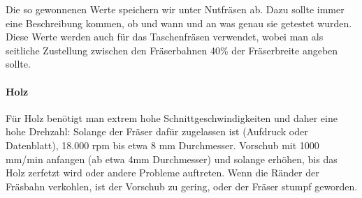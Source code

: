 \documentclass{\basedir/fablab-document}
\begin{document}
Die so gewonnenen Werte speichern wir unter Nutfräsen ab. Dazu sollte immer eine Beschreibung kommen, ob und wann und an was genau sie getestet wurden. Diese Werte werden auch für das Taschenfräsen verwendet, wobei man als seitliche Zustellung zwischen den Fräserbahnen 40\% der Fräserbreite angeben sollte.

\paragraph{Holz} Für Holz benötigt man extrem hohe Schnittgeschwindigkeiten und daher eine hohe Drehzahl: Solange der Fräser dafür zugelassen ist (Aufdruck oder Datenblatt), 18.000 rpm bis etwa 8 mm Durchmesser. Vorschub mit 1000 mm/min anfangen (ab etwa 4mm Durchmesser) und solange erhöhen, bis das Holz zerfetzt wird oder andere Probleme auftreten. Wenn die Ränder der Fräsbahn verkohlen, ist der Vorschub zu gering, oder der Fräser stumpf geworden.


\end{document}
